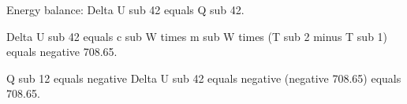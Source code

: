 Energy balance: Delta U sub 42 equals Q sub 42.

Delta U sub 42 equals c sub W times m sub W times (T sub 2 minus T sub 1) equals negative 708.65.

Q sub 12 equals negative Delta U sub 42 equals negative (negative 708.65) equals 708.65.